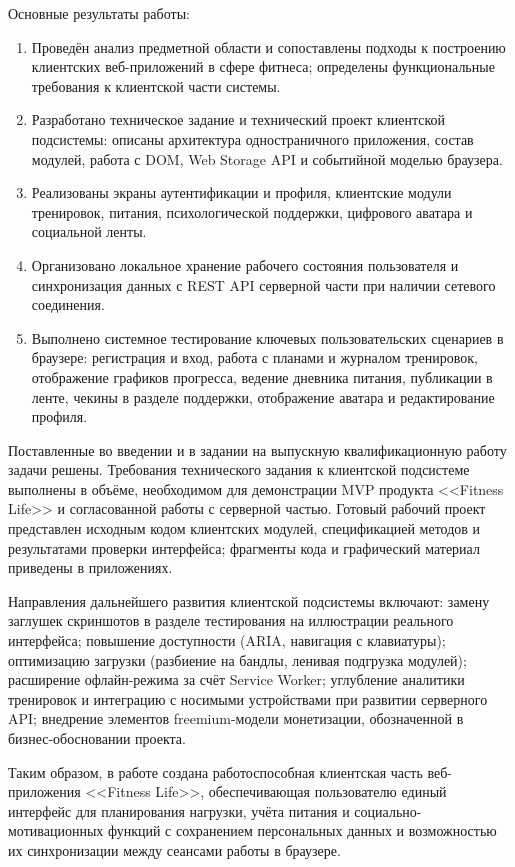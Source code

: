 Основные результаты работы:
\begin{enumerate}
\item Проведён анализ предметной области и сопоставлены подходы к построению клиентских веб-приложений в сфере фитнеса; определены функциональные требования к клиентской части системы.
\item Разработано техническое задание и технический проект клиентской подсистемы: описаны архитектура одностраничного приложения, состав модулей, работа с DOM, Web Storage API и событийной моделью браузера.
\item Реализованы экраны аутентификации и профиля, клиентские модули тренировок, питания, психологической поддержки, цифрового аватара и социальной ленты.
\item Организовано локальное хранение рабочего состояния пользователя и синхронизация данных с REST API серверной части при наличии сетевого соединения.
\item Выполнено системное тестирование ключевых пользовательских сценариев в браузере: регистрация и вход, работа с планами и журналом тренировок, отображение графиков прогресса, ведение дневника питания, публикации в ленте, чекины в разделе поддержки, отображение аватара и редактирование профиля.
\end{enumerate}

Поставленные во введении и в задании на выпускную квалификационную работу задачи решены. Требования технического задания к клиентской подсистеме выполнены в объёме, необходимом для демонстрации MVP продукта <<Fitness Life>> и согласованной работы с серверной частью. Готовый рабочий проект представлен исходным кодом клиентских модулей, спецификацией методов и результатами проверки интерфейса; фрагменты кода и графический материал приведены в приложениях.

Направления дальнейшего развития клиентской подсистемы включают: замену заглушек скриншотов в разделе тестирования на иллюстрации реального интерфейса; повышение доступности (ARIA, навигация с клавиатуры); оптимизацию загрузки (разбиение на бандлы, ленивая подгрузка модулей); расширение офлайн-режима за счёт Service Worker; углубление аналитики тренировок и интеграцию с носимыми устройствами при развитии серверного API; внедрение элементов freemium-модели монетизации, обозначенной в бизнес-обосновании проекта.

Таким образом, в работе создана работоспособная клиентская часть веб-приложения <<Fitness Life>>, обеспечивающая пользователю единый интерфейс для планирования нагрузки, учёта питания и социально-мотивационных функций с сохранением персональных данных и возможностью их синхронизации между сеансами работы в браузере.
